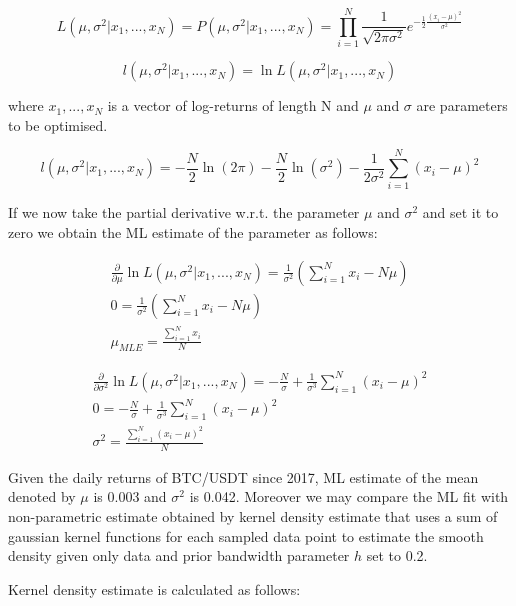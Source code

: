 \begin{equation}
L(\mu,\sigma^2|x_1,...,x_N) = P(\mu,\sigma^2|x_1,...,x_N) = \prod_{i=1}^{N} \frac{1}{\sqrt{2\pi \sigma^2}} e^{-\frac{1}{2} \frac{(x_i-\mu)^2}{\sigma^2}}
\end{equation}

\begin{equation}
l(\mu,\sigma^2|x_1,...,x_N) = \ln L(\mu,\sigma^2|x_1,...,x_N) 
\end{equation}

where $x_1,...,x_N$ is a vector of log-returns of length N and $\mu$ and $\sigma$ are parameters to be optimised. 

\begin{equation}
l(\mu,\sigma^2|x_1,...,x_N) = -\frac{N}{2} \ln(2 \pi) - \frac{N}{2} \ln(\sigma^2) - \frac{1}{2 \sigma^2} \sum_{i=1}^{N} (x_i - \mu)^2
\end{equation}

If we now take the partial derivative w.r.t. the parameter $\mu$ and $\sigma^2$ and set it to zero we obtain the ML estimate of the parameter as follows:


\begin{gather} 
\frac{\partial}{\partial \mu} \ln L(\mu,\sigma^2|x_1,...,x_N)  = \frac{1}{\sigma^2} (\sum_{i=1}^{N} x_i - N\mu) \\
0 = \frac{1}{\sigma^2} (\sum_{i=1}^{N} x_i - N\mu) \\
\mu_{MLE} = \frac{\sum_{i=1}^{N} x_i}{N}
\end{gather}

\begin{gather} 
\frac{\partial}{\partial \sigma^2} \ln L(\mu,\sigma^2|x_1,...,x_N) = -\frac{N}{\sigma}+ \frac{1}{\sigma^3} \sum_{i=1}^{N} (x_i - \mu)^2 \\
0 = -\frac{N}{\sigma}+ \frac{1}{\sigma^3} \sum_{i=1}^{N} (x_i - \mu)^2 \\
\sigma^2 = \frac{\sum_{i=1}^{N} (x_i - \mu)^2}{N}
\end{gather}


Given the daily returns of BTC/USDT since 2017, ML estimate of the mean denoted by $\mu$ is 0.003 and $\sigma^2$ is 0.042. Moreover we may compare the ML fit with non-parametric estimate obtained by kernel density estimate that uses a sum of gaussian kernel functions for each sampled data point to estimate the smooth density given only data and prior bandwidth parameter $h$ set to 0.2. 

Kernel density estimate is calculated as follows:

